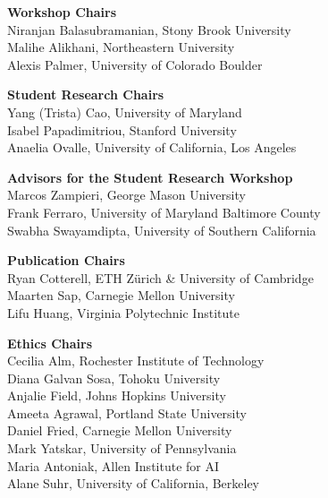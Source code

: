 {\bf Workshop Chairs} \\
\hspace*{0.2in} Niranjan Balasubramanian, Stony Brook University \\
\hspace*{0.2in} Malihe Alikhani, Northeastern University \\
\hspace*{0.2in} Alexis Palmer, University of Colorado Boulder

{\bf Student Research Chairs} \\
\hspace*{0.2in} Yang (Trista) Cao, University of Maryland \\
\hspace*{0.2in} Isabel Papadimitriou, Stanford University \\
\hspace*{0.2in} Anaelia Ovalle, University of California, Los Angeles

{\bf Advisors for the Student Research Workshop} \\
\hspace*{0.2in} Marcos Zampieri, George Mason University \\
\hspace*{0.2in} Frank Ferraro, University of Maryland Baltimore County \\
\hspace*{0.2in} Swabha Swayamdipta, University of Southern California

{\bf Publication Chairs} \\
\hspace*{0.2in} Ryan Cotterell, ETH Z\"urich \& University of Cambridge \\
\hspace*{0.2in} Maarten Sap, Carnegie Mellon University \\
\hspace*{0.2in} Lifu Huang, Virginia Polytechnic Institute

{\bf Ethics Chairs} \\
\hspace*{0.2in} Cecilia Alm, Rochester Institute of Technology \\
\hspace*{0.2in} Diana Galvan Sosa, Tohoku University \\
\hspace*{0.2in} Anjalie Field, Johns Hopkins University \\
\hspace*{0.2in} Ameeta Agrawal, Portland State University \\
\hspace*{0.2in} Daniel Fried, Carnegie Mellon University \\
\hspace*{0.2in} Mark Yatskar, University of Pennsylvania \\
\hspace*{0.2in} Maria Antoniak, Allen Institute for AI \\
\hspace*{0.2in} Alane Suhr, University of California, Berkeley

